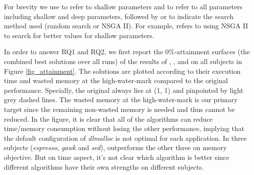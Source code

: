For brevity we use \emph{\shallow} to refer to shallow parameters and \emph{\all} to refer to all parameters including shallow and deep parameters, followed by \emph{\randomsearch} or \emph{\nsgaii} to indicate the search method used (random search or NSGA II). For example, \sn{} refers to using NSGA II to search for better values for shallow parameters.

\begin{figure*}[htb]
	\centering
	\subfigure[espresso]{
		\label{fig_attainment_espresso}
		\texttt{[image: espresso\_attainment\_best]}%
	}
	\subfigure[gawk]{
		\label{fig_attainment_gawk}
		\texttt{[image: gawk\_attainment\_best]}%
	}
	\subfigure[flex]{
		\label{fig_attainment_flex}
		\texttt{[image: flex\_attainment\_best]}%
	}
	\subfigure[sed]{
		\label{fig_attainment_sed}
		\texttt{[image: sed\_attainment\_best]}%
	}
	\caption{0\%-attainment surfaces of the results of \sr{}, \sn{}, \dr{}, \dn{} over 20 runs for each application.}\label{fig_attainment}
\end{figure*}

In order to answer RQ1 and RQ2, we first report the 0\%-attainment surfaces (the combined best solutions over all runs) of the results of \sr{}, \sn{}, \dr{} and \dn{} on all subjects in Figure \ref{fig_attainment}. The solutions are plotted according to their execution time and wasted memory at the high-water-mark compared to the original performance. Specially, the original always lies at (1, 1) and pinpointed by light grey dashed lines. The wasted memory at the high-water-mark is our primary target since the remaining non-wasted memory is needed and thus cannot be reduced. 
In the figure, it is clear that all of the algorithms can reduce time/memory consumption without losing the other performance, implying that the default configuration of \emph{dlmalloc} is not optimal for each application. In three subjects (\emph{espresso}, \emph{gawk} and \emph{sed}), \dn{} outperforms the other three on memory objective. But on time aspect, it's not clear which algorithm is better since different algorithms have their own strengths on different subjects. 

